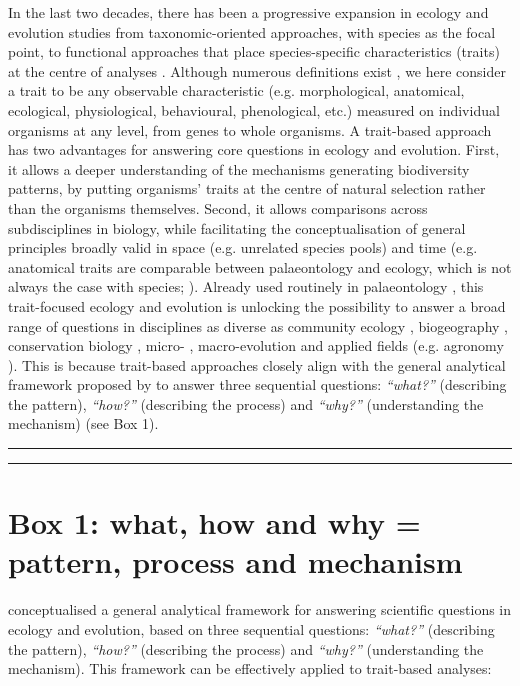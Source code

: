 \documentclass[12pt,letterpaper]{article}
\begin{document}
In the last two decades, there has been a progressive expansion in ecology and evolution studies from taxonomic-oriented approaches, with species as the focal point, to functional approaches that place species-specific characteristics (traits) at the centre of analyses \citep{violle2007let, mammola2021concepts, palacio2022protocol}. Although numerous definitions exist \citep{dawson2021traits}, we here consider a trait to be any observable characteristic (e.g. morphological, anatomical, ecological, physiological, behavioural, phenological, etc.) measured on individual organisms at any level, from genes to whole organisms.
A trait-based approach has two advantages for answering core questions in ecology and evolution.
First, it allows a deeper understanding of the mechanisms generating biodiversity patterns, by putting organisms' traits at the centre of natural selection rather than the organisms themselves.
Second, it allows comparisons across subdisciplines in biology, while facilitating the conceptualisation of general principles broadly valid in space (e.g. unrelated species pools) and time (e.g. anatomical traits are comparable between palaeontology and ecology, which is not always the case with species; \citealt{luza2023going}).
Already used routinely in palaeontology \citep{raup1961geometry, gould1991disparity, foote1995morphological, guillerme2020disparities}, this trait-focused ecology and evolution is unlocking the possibility to answer a broad range of questions in disciplines as diverse as community ecology \citep{mcgill2006rebuilding}, biogeography \citep{violle2014emergence}, conservation biology \citep{chichorro2022trait}, micro- \citep{chapin1993evolution}, macro-evolution \citep{guillerme2023innovation} and applied fields (e.g. agronomy \citealt{martin2015plant}).
This is because trait-based approaches closely align with the general analytical framework proposed by \cite{anand1994pattern} to answer three sequential questions: \textit{``what?''} (describing the pattern), \textit{``how?''} (describing the process) and \textit{``why?''} (understanding the mechanism) (see Box 1).

\bigskip
\bigskip
\hrule
\hrule

\section*{Box 1: what, how and why = pattern, process and mechanism}
\cite{anand1994pattern} conceptualised a general analytical framework for answering scientific questions in ecology and evolution, based on three sequential questions: \textit{``what?''} (describing the pattern), \textit{``how?''} (describing the process) and \textit{``why?''} (understanding the mechanism).
This framework can be effectively applied to trait-based analyses:
\end{document}
